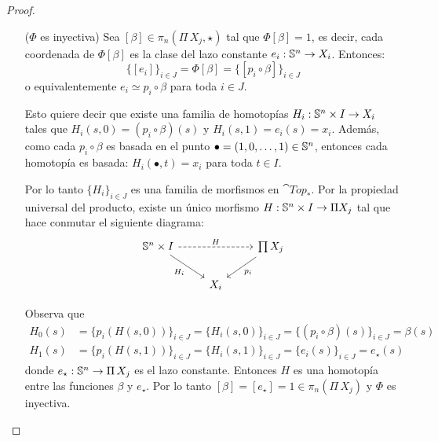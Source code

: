 \documentclass[../../topologia_algebraica]{subfiles}
\begin{document}
\begin{proof}
\begin{enumerate}
    Observa que $[\widetilde{\alpha}]\in\pi_n(\Pi X_j,\star)$, entonces:
    \[
      \Phi[\widetilde{\alpha}]=
      \big\{(q_i\circ\Phi)[\widetilde{\alpha}] \big\}_{i\in J}=
      \big\{(p_i)_{\#}[\widetilde{\alpha}]\big\}_{i\in J}=
      \big\{[p_i\circ \widetilde{\alpha}]\big\}_{i\in J}=
      \big\{[\alpha_i]\big\}_{i\in J}=\alpha
    \]
    Por lo tanto $[\widetilde{\alpha}]$ est\'a en la preimagen de $\alpha$ y as\'i $\Phi$ es
    sobre.
  \item[($\Phi$ es inyectiva)] Sea $[\beta]\in \pi_n(\Pi\,X_j,\star)$ tal que $\Phi[\beta]=1$,
    es decir, cada coordenada de $\Phi[\beta]$ es la clase del lazo constante $e_i:\mathbb{S}^n\rightarrow X_i$.
    Entonces:
    \[
      \big\{[e_i]\}_{i\in J}=
      \Phi[\beta]=
      \big\{ [p_i\circ\beta] \big\}_{i\in J}
    \]
    o equivalentemente $e_i\simeq p_i\circ\beta$ para toda $i\in J$.

    Esto quiere decir que existe una familia de homotop\'ias $H_i:\mathbb{S}^n\times I \rightarrow X_i$ tales que
    $H_i(s,0)=(p_i\circ\beta)(s)$ y $H_i(s,1)=e_i(s)=x_i$. Adem\'as, como cada $p_i\circ\beta$ es
    basada en el punto $\bullet=(1,0,\ldots,1)\in\mathbb{S}^n$, entonces cada homotop\'ia es basada:
    $H_i(\bullet,t)=x_i$ para toda $t\in I$.

    Por lo tanto $\{H_i\}_{i\in J}$ es una familia de morfismos en $\cat{Top}_*$. Por la propiedad
    universal del producto, existe un \'unico morfismo $H:\mathbb{S}^n\times I\rightarrow \Pi X_j$ tal que hace
    conmutar el siguiente diagrama:
    \[
      \begin{tikzcd}
        \Sn^n\times I \arrow[rr,dashed,"H"] \arrow[dr,"H_i"'] &&
        \prod X_j \arrow[dl,"p_i"] \\
        & X_i  &
      \end{tikzcd}
    \]

    Observa que
    \begin{align*}
      H_0(s)&=
      \big\{ p_i(H(s,0)) \big\}_{i\in J}=
      \big\{ H_i(s,0) \big\}_{i\in J}=
      \big\{ (p_i\circ \beta )(s) \big\}_{i\in J}=
      \beta(s)\\
      H_1(s)&=
      \big\{ p_i(H(s,1)) \big\}_{i\in J}=
      \big\{ H_i(s,1) \big\}_{i\in J}=
      \big\{ e_i(s) \big\}_{i\in J}=
      e_{\star}(s)
    \end{align*}
    donde $e_{\star}:\mathbb{S}^n\rightarrow\Pi\, X_j$ es el lazo constante. Entonces $H$ es una homotop\'ia
    entre las funciones $\beta$ y $e_{\star}$. Por lo tanto $[\beta]=[e_{\star}]=1\in\pi_n(\Pi\, X_j)$
    y $\Phi$ es inyectiva.
  \end{enumerate}
\end{proof}
\end{document}
